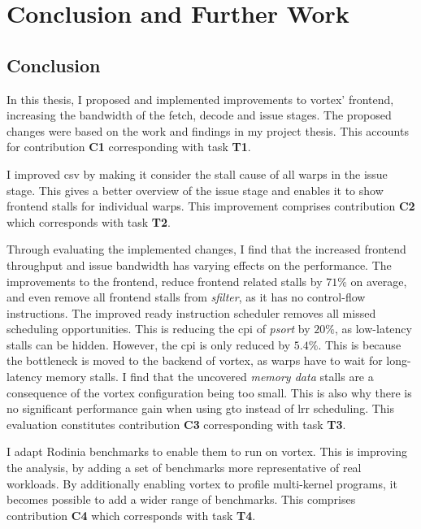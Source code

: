 \chapter{Conclusion and Further Work}

\section{Conclusion}

In this thesis, I proposed and implemented improvements to \Gls{vortex}' frontend, increasing the bandwidth of the fetch, decode and issue stages. The proposed changes were based on the work and findings in my project thesis. This accounts for contribution \textbf{C1} corresponding with task \textbf{T1}.

I improved \acrshort{csv} by making it consider the stall cause of all warps in the issue stage. This gives a better overview of the issue stage and enables it to show frontend stalls for individual warps. This improvement comprises contribution \textbf{C2} which corresponds with task \textbf{T2}. 

Through evaluating the implemented changes, I find that the increased frontend throughput and issue bandwidth has varying effects on the performance. The improvements to the frontend, reduce frontend related stalls by $71\%$ on average, and even remove all frontend stalls from \textit{sfilter}, as it has no control-flow instructions. The improved ready instruction scheduler removes all missed scheduling opportunities. This is reducing the \acrshort{cpi} of \textit{psort} by $20\%$, as low-latency stalls can be hidden. However, the \acrshort{cpi} is only reduced by $5.4\%$. This is because the bottleneck is moved to the backend of \Gls{vortex}, as warps have to wait for long-latency memory stalls. I find that the uncovered \textit{memory data} stalls are a consequence of the \Gls{vortex} configuration being too small. This is also why there is no significant performance gain when using \acrshort{gto} instead of \acrshort{lrr} scheduling. This evaluation constitutes contribution \textbf{C3} corresponding with task \textbf{T3}.

I adapt Rodinia benchmarks to enable them to run on \Gls{vortex}. This is improving the analysis, by adding a set of benchmarks more representative of real workloads. By additionally enabling \Gls{vortex} to profile multi-kernel programs, it becomes possible to add a wider range of benchmarks. This comprises contribution \textbf{C4} which corresponds with task \textbf{T4}.

